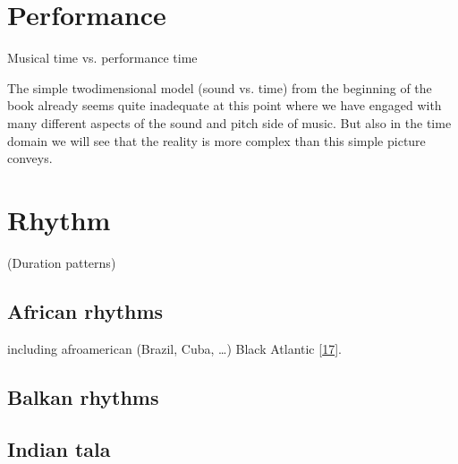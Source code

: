 \documentclass[letterpaper,10pt,english]{sphinxmanual}
\begin{document}
\section{Performance}
\label{\detokenize{4_time:performance}}
\sphinxAtStartPar
Musical time vs. performance time

\sphinxAtStartPar
The simple two\sphinxhyphen{}dimensional model (sound vs. time) from the beginning of the book already
seems quite inadequate at this point where we have engaged with many different aspects of the
sound and pitch side of music. But also in the time domain we will see that the reality is more
complex than this simple picture conveys.


\section{Rhythm}
\label{\detokenize{4_time:rhythm}}
\sphinxAtStartPar
(Duration patterns)


\subsection{African rhythms}
\label{\detokenize{4_time:african-rhythms}}
\sphinxAtStartPar
including afro\sphinxhyphen{}american (Brazil, Cuba, …) Black Atlantic {[}\hyperlink{cite.8_bibliography:id6}{17}{]}.


\subsection{Balkan rhythms}
\label{\detokenize{4_time:balkan-rhythms}}

\subsection{Indian tala}
\label{\detokenize{4_time:indian-tala}}
\end{document}
